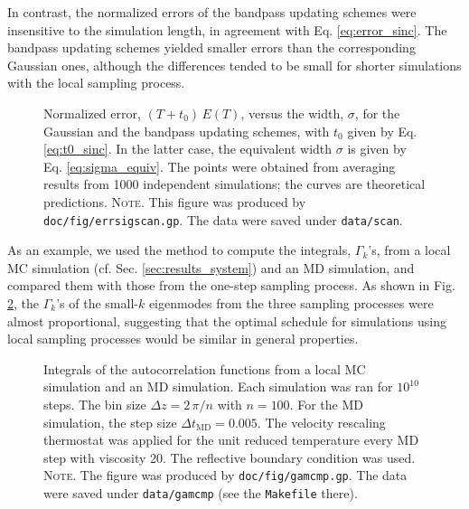 \documentclass[preprint, floatfix]{revtex4-1}
\newcommand{\note}[1]{{\color{DarkGreen}\footnotesize \textsc{Note.} #1}}
\newcommand{\Err}{E}
\begin{document}
In contrast,
the normalized errors of the bandpass updating schemes
were insensitive to the simulation length,
in agreement with Eq. \eqref{eq:error_sinc}.
%
The bandpass updating schemes
yielded smaller errors than
the corresponding Gaussian ones,
although the differences tended to
be small for shorter simulations
with the local sampling process.



\begin{figure}[h]
\begin{center}
  \caption{
    \label{fig:errsigscan}
    Normalized error, $(T + t_0) \, \Err(T)$,
    versus the width, $\sigma$,
    for the Gaussian
    and the bandpass updating schemes,
    with $t_0$ given by Eq. \eqref{eq:t0_sinc}.
    In the latter case,
    the equivalent width
    $\sigma$ is given by Eq. \eqref{eq:sigma_equiv}.
    The points were obtained from averaging results
    from 1000 independent simulations;
    the curves are theoretical predictions.
    \note{This figure was produced by
      \texttt{doc/fig/errsigscan.gp}.
      The data were saved under
      \texttt{data/scan}.
    }%
  }
\end{center}
\end{figure}



As an example, we used the method to compute
the integrals, $\Gamma_k$'s, from
a local MC simulation
(cf. Sec. \ref{sec:results_system})
and an MD simulation,
and compared them with those from
the one-step sampling process.
%
As shown in Fig. \ref{fig:gamcmp},
the $\Gamma_k$'s of the small-$k$ eigenmodes
from the three sampling processes
were almost proportional,
suggesting that
the optimal schedule
for simulations using local sampling processes
would be similar in general properties.



\begin{figure}[h]
\begin{center}
  \caption{
    \label{fig:gamcmp}
    Integrals of the autocorrelation functions
    from a local MC simulation
    and an MD simulation.
    Each simulation was ran for $10^{10}$ steps.
    The bin size $\Delta z = 2\, \pi /n$ with $n = 100$.
    For the MD simulation,
    the step size $\Delta t_\mathrm{MD} = 0.005$.
    The velocity rescaling thermostat\cite{bussi2007} was
    applied for the unit reduced temperature
    every MD step with viscosity $20$.
    The reflective boundary condition was used.
    \note{The figure was produced by \texttt{doc/fig/gamcmp.gp}.
      The data were saved under \texttt{data/gamcmp}
      (see the \texttt{Makefile} there).
    }%
  }
\end{center}
\end{figure}
\end{document}
